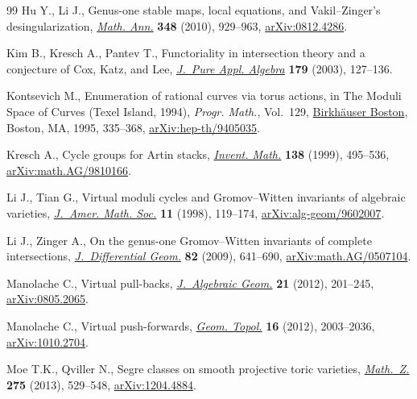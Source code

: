 \documentclass[pdftex]{sigma}
\numberwithin{equation}{section}
\theoremstyle{plain}
\theoremstyle{definition}
\theoremstyle{remark}
\begin{document}
\begin{thebibliography}{99}
Hu Y., Li J., Genus-one stable maps, local equations, and {V}akil--{Z}inger's
 desingularization, \href{https://doi.org/10.1007/s00208-010-0504-8}{\textit{Math. Ann.}} \textbf{348} (2010), 929--963,
 \href{https://arxiv.org/abs/0812.4286}{arXiv:0812.4286}.

Kim B., Kresch A., Pantev T., Functoriality in intersection theory and a
 conjecture of {C}ox, {K}atz, and {L}ee, \href{https://doi.org/10.1016/S0022-4049(02)00293-1}{\textit{J.~Pure Appl. Algebra}}
 \textbf{179} (2003), 127--136.

Kontsevich M., Enumeration of rational curves via torus actions, in The Moduli
 Space of Curves ({T}exel {I}sland, 1994), \textit{Progr. Math.}, Vol.~129,
 \href{https://doi.org/10.1007/978-1-4612-4264-2_12}{Birkh\"{a}user Boston}, Boston, MA, 1995, 335--368, \href{https://arxiv.org/abs/hep-th/9405035}{arXiv:hep-th/9405035}.

Kresch A., Cycle groups for {A}rtin stacks, \href{https://doi.org/10.1007/s002220050351}{\textit{Invent. Math.}} \textbf{138} (1999), 495--536, \href{https://arxiv.org/abs/math.AG/9810166}{arXiv:math.AG/9810166}.

Li J., Tian G., Virtual moduli cycles and {G}romov--{W}itten invariants of
 algebraic varieties, \href{https://doi.org/10.1090/S0894-0347-98-00250-1}{\textit{J.~Amer. Math. Soc.}} \textbf{11} (1998),
 119--174, \href{https://arxiv.org/abs/alg-geom/9602007}{arXiv:alg-geom/9602007}.

Li J., Zinger A., On the genus-one {G}romov--{W}itten invariants of complete
 intersections, \href{https://doi.org/10.4310/jdg/1251122549}{\textit{J.~Differential Geom.}} \textbf{82} (2009), 641--690, \href{https://arxiv.org/abs/math.AG/0507104}{arXiv:math.AG/0507104}.

Manolache C., Virtual pull-backs, \href{https://doi.org/10.1090/S1056-3911-2011-00606-1}{\textit{J.~Algebraic Geom.}} \textbf{21}
 (2012), 201--245, \href{https://arxiv.org/abs/0805.2065}{arXiv:0805.2065}.

Manolache C., Virtual push-forwards, \href{https://doi.org/10.2140/gt.2012.16.2003}{\textit{Geom. Topol.}} \textbf{16} (2012),
 2003--2036, \href{https://arxiv.org/abs/1010.2704}{arXiv:1010.2704}.

Moe T.K., Qviller N., Segre classes on smooth projective toric varieties,
 \href{https://doi.org/10.1007/s00209-013-1146-9}{\textit{Math.~Z.}} \textbf{275} (2013), 529--548, \href{https://arxiv.org/abs/1204.4884}{arXiv:1204.4884}.


\end{thebibliography}
\end{document}
